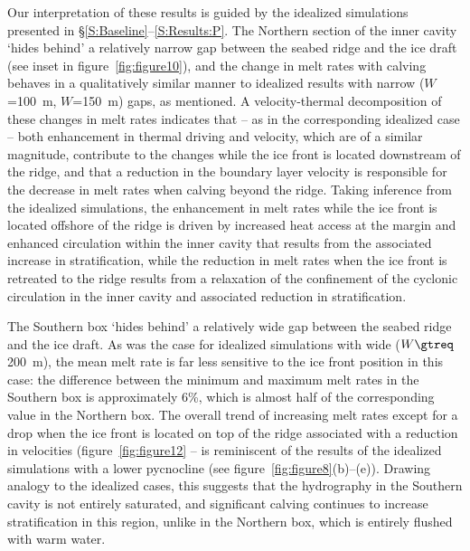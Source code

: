 \documentclass[draft]{agujournal2019}
\begin{document}
Our interpretation of these results is guided by the idealized simulations presented in \S\ref{S:Baseline}--\ref{S:Results:P}. The Northern section of the inner cavity `hides behind' a relatively narrow gap between the seabed ridge and the ice draft (see inset in figure~\ref{fig:figure10}), and the change in melt rates with calving behaves in a qualitatively similar manner to idealized results with narrow ($W$=100~m, $W$=150~m) gaps, as mentioned. A velocity-thermal decomposition of these changes in melt rates indicates that -- as in the corresponding idealized case -- both enhancement in thermal driving and velocity, which are of a similar magnitude, contribute to the changes while the ice front is located downstream of the ridge, and that a reduction in the boundary layer velocity is responsible for the decrease in melt rates when calving beyond the ridge. Taking inference from the idealized simulations, the enhancement in melt rates while the ice front is located offshore of the ridge is driven by increased heat access at the margin and enhanced circulation within the inner cavity that results from the associated increase in stratification, while the reduction in melt rates when the ice front is retreated to the ridge results from a relaxation of the confinement of the cyclonic circulation in the inner cavity and associated reduction in stratification.


The Southern box `hides behind' a relatively wide gap between the seabed ridge and the ice draft. As was the case for idealized simulations with wide ($W \gtreq$200~m), the mean melt rate is far less sensitive to the ice front position in this case: the difference between the minimum and maximum melt rates in the Southern box is approximately 6\%, which is almost half of the corresponding value in the Northern box. The overall trend of increasing melt rates except for a drop when the ice front is located on top of the ridge associated with a reduction in velocities (figure~\ref{fig:figure12} --  is reminiscent of the results of the idealized simulations with a lower pycnocline (see figure~\ref{fig:figure8}(b)--(e)). Drawing analogy to the idealized cases, this suggests that the hydrography in the Southern cavity is not entirely saturated, and significant calving continues to increase stratification in this region, unlike in the Northern box, which is entirely flushed with warm water.
\end{document}
